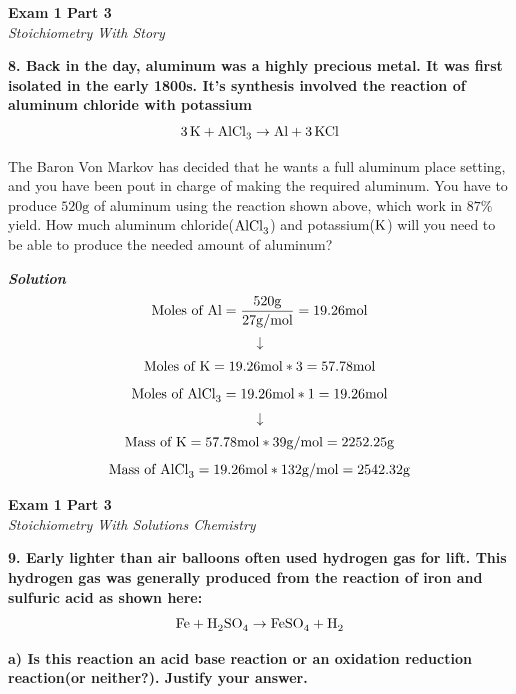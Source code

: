 \documentclass{article}
\begin{document}
    \pagebreak

    \begin{center}
        \textbf{Exam 1 Part 3}\\
        \textit{Stoichiometry With Story}
    \end{center}
    \textbf{8. Back in the day, aluminum was a highly precious metal. It was first isolated in the early 1800s. It's synthesis involved the reaction of aluminum chloride with potassium}
    $$ \ce{3K} + \ce{AlCl3} \rightarrow \ce{Al} + \ce{3KCl}$$

    The Baron Von Markov has decided that he wants a full aluminum place setting, and you have been pout in charge of making the required aluminum. You have to produce $520 \si{\gram}$ of aluminum using the reaction shown above, which work in $87\%$ yield. How much aluminum chloride($\ce{AlCl_{3}}$) and potassium($\ce{K}$) will you need to be able to produce the needed amount of aluminum?

    \textbf{\textit{Solution}}
    $$ \text{Moles of \ce{Al}} = \dfrac{520 \si{\gram}}{27 \si[per-mode=symbol]{\gram\per\mol}} = 19.26 \si{\mole}$$
    $$\downarrow$$
    $$ \text{Moles of \ce{K}} = 19.26 \si{\mole} * 3 = 57.78 \si{\mole} $$
    $$ \text{Moles of \ce{AlCl3}} = 19.26 \si{\mole} * 1 = 19.26 \si{\mole} $$
    $$\downarrow$$
    $$ \text{Mass of \ce{K}} = 57.78 \si{\mole} * 39 \si[per-mode=symbol]{\gram\per\mol} = 2252.25 \si{\gram}$$
    $$ \text{Mass of \ce{AlCl3}} = 19.26 \si{\mole} * 132 \si[per-mode=symbol]{\gram\per\mol} = 2542.32 \si{\gram} $$

    \pagebreak

    \begin{center}
        \textbf{Exam 1 Part 3}\\
        \textit{Stoichiometry With Solutions Chemistry}
    \end{center}
    \textbf{9. Early lighter than air balloons often used hydrogen gas for lift. This hydrogen gas was generally produced from the reaction of iron and sulfuric acid as shown here:}
    $$\ce{Fe} + \ce{H_{2}SO_{4}} \rightarrow \ce{FeSO_{4}} + \ce{H_{2}}$$

    \textbf{a) Is this reaction an acid base reaction or an oxidation reduction reaction(or neither?). Justify your answer.}
\end{document}
